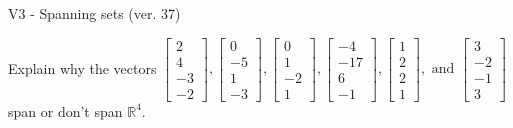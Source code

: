 \begin{exercise}
  \begin{exerciseTitle}V3 - Spanning sets (ver. 37)\end{exerciseTitle}
  \begin{exerciseStatement}
    Explain why the vectors \(\left[\begin{array}{r}
2 \\
4 \\
-3 \\
-2
\end{array}\right] , \left[\begin{array}{r}
0 \\
-5 \\
1 \\
-3
\end{array}\right] , \left[\begin{array}{r}
0 \\
1 \\
-2 \\
1
\end{array}\right] , \left[\begin{array}{r}
-4 \\
-17 \\
6 \\
-1
\end{array}\right] , \left[\begin{array}{r}
1 \\
2 \\
2 \\
1
\end{array}\right] , \text{ and } \left[\begin{array}{r}
3 \\
-2 \\
-1 \\
3
\end{array}\right]\) span or don't span \(\mathbb{R}^4\). 
	



\end{exerciseStatement}
\end{exercise}
